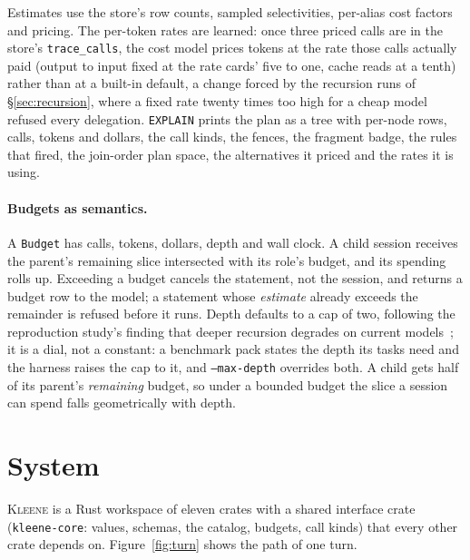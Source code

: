 \documentclass[11pt,a4paper]{article}
\newcommand{\kleene}{\textsc{Kleene}}
\newcommand{\code}[1]{\texttt{#1}}
\begin{document}
Estimates use the store's row counts, sampled selectivities, per-alias cost
factors and pricing. The per-token rates are learned: once three priced
calls are in the store's \code{trace\_calls}, the cost model prices tokens
at the rate those calls actually paid (output to input fixed at the rate
cards' five to one, cache reads at a tenth) rather than at a built-in
default, a change forced by the recursion runs of \S\ref{sec:recursion},
where a fixed rate twenty times too high for a cheap model refused every
delegation. \code{EXPLAIN} prints the plan as a tree with per-node rows,
calls, tokens and dollars, the call kinds, the fences, the fragment badge,
the rules that fired, the join-order plan space, the alternatives it priced
and the rates it is using.

\paragraph{Budgets as semantics.} A \code{Budget} has calls, tokens, dollars,
depth and wall clock. A child session receives the parent's remaining slice
intersected with its role's budget, and its spending rolls up. Exceeding a
budget cancels the statement, not the session, and returns a budget row to the
model; a statement whose \emph{estimate} already exceeds the remainder is
refused before it runs. Depth defaults to a cap of two, following the
reproduction study's finding that deeper recursion degrades on current
models~\citep{wang2026reproducing}; it is a dial, not a constant: a
benchmark pack states the depth its tasks need and the harness raises the
cap to it, and \code{--max-depth} overrides both. A child gets half of its
parent's \emph{remaining} budget, so under a bounded budget the slice a
session can spend falls geometrically with depth.

\section{System}
\label{sec:system}

\kleene{} is a Rust workspace of eleven crates with a shared interface crate
(\code{kleene-core}: values, schemas, the catalog, budgets, call kinds) that
every other crate depends on. Figure~\ref{fig:turn} shows the path of one turn.
\end{document}
